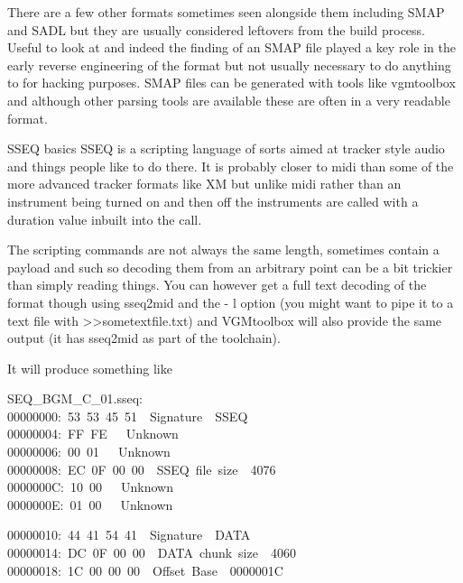 \documentclass[
]{book}
\begin{document}
There are a few other formats sometimes seen alongside them including SMAP and SADL but they are usually considered leftovers from the build process. Useful to look at and indeed the finding of an SMAP file played a key role in the early reverse engineering of the format but not usually necessary to do anything to for hacking purposes. SMAP files can be generated with tools like vgmtoolbox and although other parsing tools are available these are often in a very readable format.

SSEQ basics SSEQ is a scripting language of sorts aimed at tracker style audio and things people like to do there. It is probably closer to midi than some of the more advanced tracker formats like XM but unlike midi rather than an instrument being turned on and then off the instruments are called with a duration value inbuilt into the call.

The scripting commands are not always the same length, sometimes contain a payload and such so decoding them from an arbitrary point can be a bit trickier than simply reading things. You can however get a full text decoding of the format though using sseq2mid and the - l option (you might want to pipe it to a text file with \textgreater﻿\textgreater sometextfile.txt) and VGMtoolbox will also provide the same output (it has sseq2mid as part of the toolchain).

It will produce something like

SEQ\_BGM\_C\_01.sseq:\\
00000000:~53~53~45~51~\textbar~Signature~\textbar~SSEQ\\
00000004:~FF~FE~\textbar~\textbar~Unknown\\
00000006:~00~01~\textbar~\textbar~Unknown\\
00000008:~EC~0F~00~00~\textbar~SSEQ~file~size~\textbar~4076\\
0000000C:~10~00~\textbar~\textbar~Unknown\\
0000000E:~01~00~\textbar~\textbar~Unknown

00000010:~44~41~54~41~\textbar~Signature~\textbar~DATA\\
00000014:~DC~0F~00~00~\textbar~DATA~chunk~size~\textbar~4060\\
00000018:~1C~00~00~00~\textbar~Offset~Base~\textbar~0000001C
\end{document}
